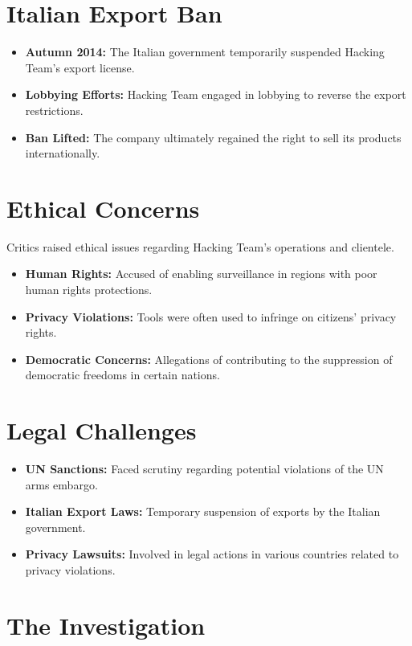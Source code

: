 \section{Italian Export Ban}
\begin{itemize}
    \item \textbf{Autumn 2014:} The Italian government temporarily suspended Hacking Team’s export license.
    \item \textbf{Lobbying Efforts:} Hacking Team engaged in lobbying to reverse the export restrictions.
    \item \textbf{Ban Lifted:} The company ultimately regained the right to sell its products internationally.
\end{itemize}

\section{Ethical Concerns}
Critics raised ethical issues regarding Hacking Team’s operations and clientele.
\begin{itemize}
    \item \textbf{Human Rights:} Accused of enabling surveillance in regions with poor human rights protections.
    \item \textbf{Privacy Violations:} Tools were often used to infringe on citizens’ privacy rights.
    \item \textbf{Democratic Concerns:} Allegations of contributing to the suppression of democratic freedoms in certain nations.
\end{itemize}

\section{Legal Challenges}
\begin{itemize}
    \item \textbf{UN Sanctions:} Faced scrutiny regarding potential violations of the UN arms embargo.
    \item \textbf{Italian Export Laws:} Temporary suspension of exports by the Italian government.
    \item \textbf{Privacy Lawsuits:} Involved in legal actions in various countries related to privacy violations.
\end{itemize}

\section{The Investigation}

